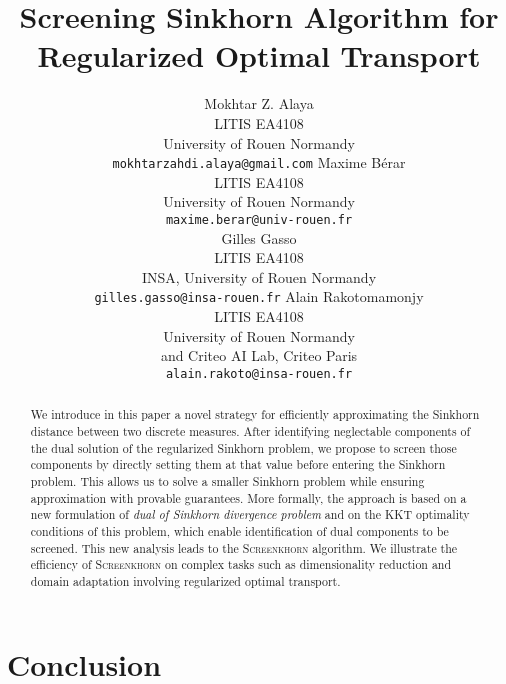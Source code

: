 \documentclass{article}
\title{Screening Sinkhorn Algorithm for Regularized Optimal Transport}
\begin{document}
\author{%
Mokhtar Z. Alaya \\
LITIS EA4108\\
University of Rouen Normandy\\
\texttt{mokhtarzahdi.alaya@gmail.com} 
\And
Maxime Bérar\\
LITIS EA4108\\
University of Rouen Normandy\\
\texttt{maxime.berar@univ-rouen.fr} \\
\And
Gilles Gasso \\
LITIS EA4108\\
INSA, University of Rouen Normandy\\
\texttt{gilles.gasso@insa-rouen.fr} 
\And
Alain Rakotomamonjy\\
LITIS EA4108 \\
University of Rouen Normandy\\
and Criteo AI Lab, Criteo Paris \\
\texttt{alain.rakoto@insa-rouen.fr} \\
}

\maketitle

\begin{abstract}
We introduce in this paper a novel strategy for efficiently approximating the Sinkhorn distance between two discrete measures. After identifying neglectable components
of the dual solution of the regularized Sinkhorn problem, we propose to screen those components by directly setting them at that value before entering the Sinkhorn problem. This allows us to solve a smaller Sinkhorn problem while ensuring approximation with provable guarantees.
More formally, the approach is based on a new formulation of \emph{dual of Sinkhorn divergence problem} and on the KKT optimality conditions of this problem, which enable identification of dual components to be screened.
This new analysis leads to the \textsc{Screenkhorn} algorithm.
We illustrate the efficiency of \textsc{Screenkhorn} on complex tasks such as dimensionality reduction and domain adaptation involving regularized optimal transport.
\end{abstract}







\section{Conclusion}
\end{document}
